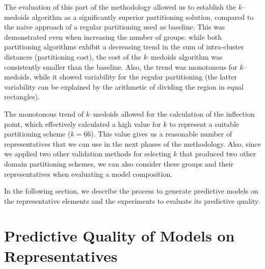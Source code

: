 The evaluation of this part of the methodology allowed us to establish the $k$--medoids algorithm as a significantly superior partitioning solution, compared to the naive approach of a regular partitioning used as baseline. This was demonstrated even when increasing the number of groups: while both partitioning algorithms exhibit a decreasing trend in the sum of intra-cluster distances (partitioning cost), the cost of the $k$--medoids algorithm was consistently smaller than the baseline. Also, the trend was monotonous for $k$--medoids, while it showed variability for the regular partitioning (the latter variability can be explained by the arithmetic of dividing the region in equal rectangles). 

The monotonous trend of $k$--medoids allowed for the calculation of the inflection point, which effectively calculated a high value for $k$ to represent a suitable partitioning scheme ($k = 66$). This value gives us a reasonable number of representatives that we can use in the next phases of the methodology. Also, since we applied two other validation methods for selecting $k$ that produced two other domain partitioning schemes, we can also consider these groups and their representatives when evaluating a model composition. 



In the following section, we describe the process to generate predictive models on the representative elements and the experiments to evaluate its predictive quality.

\section{Predictive Quality of Models on Representatives}
\label{Sec:AnalyzePredictorRepresentatives}

